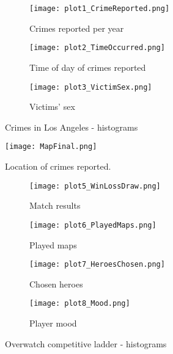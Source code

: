 \documentclass{article}
\begin{document}
\begin{figure}
\centering
\begin{subfigure}[b]{0.45\textwidth}
\texttt{[image: plot1\_CrimeReported.png]}
\caption{Crimes reported per year}
\label{fig:crpy}
\end{subfigure}
\begin{subfigure}[b]{0.45\textwidth}
\texttt{[image: plot2\_TimeOccurred.png]}
\caption{Time of day of crimes reported}
\label{fig:crtod}
\end{subfigure}
    
\begin{subfigure}[b]{0.45\textwidth}
\texttt{[image: plot3\_VictimSex.png]}
\caption{Victims' sex}
\label{fig:vi_se}
\end{subfigure}
\caption{Crimes in Los Angeles - histograms}\label{fig:clah}
\end{figure}

\begin{figure}
\centering
\texttt{[image: MapFinal.png]}
\caption{Location of crimes reported.}
\label{fig:map}
\end{figure}

\begin{figure}
\centering
\begin{subfigure}[b]{0.45\textwidth}
\texttt{[image: plot5\_WinLossDraw.png]}
\caption{Match results}
\label{fig:ma_re}
\end{subfigure}
\begin{subfigure}[b]{0.45\textwidth}
\texttt{[image: plot6\_PlayedMaps.png]}
\caption{Played maps}
\label{fig:pl_ma}
\end{subfigure}
    
\begin{subfigure}[b]{0.45\textwidth}
\texttt{[image: plot7\_HeroesChosen.png]}
\caption{Chosen heroes}
\label{fig:ch_he}
\end{subfigure}
\begin{subfigure}[b]{0.45\textwidth}
\texttt{[image: plot8\_Mood.png]}
\caption{Player mood}
\label{fig:pl_mo}
\end{subfigure}
\caption{Overwatch competitive ladder - histograms}\label{fig:oclh}
\end{figure}
\end{document}
